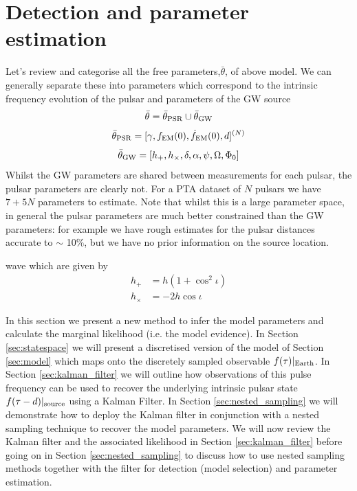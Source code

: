 \documentclass[fleqn,usenatbib,useAMS]{mnras}
\begin{document}
\section{Detection and parameter estimation} \label{sec:detect}
Let's review and categorise all the free parameters,$\bar{\theta}$, of above model. We can generally separate these into parameters which correspond to the intrinsic frequency evolution of the pulsar and parameters of the GW source
\begin{equation}
	\bar{\theta} =  \bar{\theta}_{\rm PSR} \cup \bar{\theta}_{\rm GW}
\end{equation}
\begin{equation}
	\bar{\theta}_{\rm PSR} = [\gamma, f_{\rm EM}(0), \dot{f}_{\rm EM}(0),d]^{(N)}
\end{equation}
\begin{equation}
	\bar{\theta}_{\rm GW} = [h_{+}, h_{\times}, \delta, \alpha, \psi, \Omega, \Phi_0]
\end{equation}
Whilst the GW parameters are shared between measurements for each pulsar, the pulsar parameters are clearly not. For a PTA dataset of $N$ pulsars we have $7 + 5N$ parameters to estimate. Note that whilst this is a large parameter space, in general the pulsar parameters are much better constrained than the GW parameters: for example we have rough estimates for the pulsar distances accurate to $\sim$ 10$\%$, but we have no prior information on the source location. \newline 




wave which are given by
\begin{align}
	h_+ &= h(1 + \cos^2 \iota) \\
	h_{\times} &= -2h\cos \iota
\end{align}

In this section we present a new method to infer the model parameters and calculate the marginal likelihood (i.e. the model evidence). In Section \ref{sec:statespace} we will present a discretised version of the model of Section \ref{sec:model} which maps onto the discretely sampled observable $f(\tau)|_{\rm Earth}$. In Section \ref{sec:kalman_filter} we will outline how observations of this pulse frequency can be used to recover the underlying intrinsic pulsar state $f(\tau -d)|_{\rm source}$ using a Kalman Filter. In Section \ref{sec:nested_sampling} we will demonstrate how to deploy the Kalman filter in conjunction with a nested sampling technique to recover the model parameters. We will now review the Kalman filter and the associated likelihood in Section \ref{sec:kalman_filter} before going on in Section \ref{sec:nested_sampling} to discuss how to use nested sampling methods together with the filter for detection (model selection) and parameter estimation. 
\end{document}
